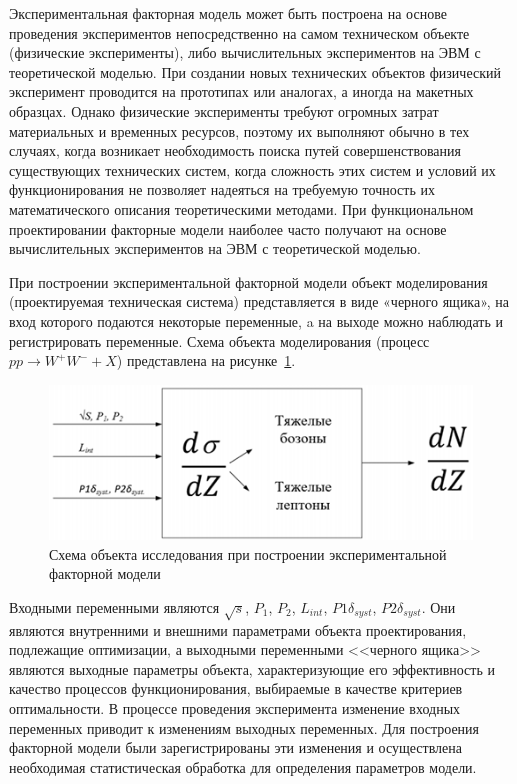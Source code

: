 Экспериментальная факторная модель может быть построена на основе
проведения экспериментов непосредственно на самом техническом объекте
(физические эксперименты), либо вычислительных экспериментов на ЭВМ с
теоретической моделью. При создании новых технических объектов физический
эксперимент проводится на прототипах или аналогах, а иногда на макетных
образцах. Однако физические эксперименты требуют огромных затрат
материальных и временных ресурсов, поэтому их выполняют обычно в тех
случаях, когда возникает необходимость поиска путей совершенствования
существующих технических систем, когда сложность этих систем и условий их
функционирования не позволяет надеяться на требуемую точность их
математического описания теоретическими методами. При функциональном
проектировании факторные модели наиболее часто получают на основе
вычислительных экспериментов на ЭВМ с теоретической моделью. 

При построении экспериментальной факторной модели объект
моделирования (проектируемая техническая система) представляется в виде
«черного ящика», на вход которого подаются некоторые переменные, a на
выходе можно наблюдать и регистрировать переменные. Схема объекта
моделирования (процесс $pp \rightarrow W^+W^- + X$) представлена на рисунке~\ref{fig:schema-model}.

\begin{figure}[!h]
	\centering
	\includegraphics[width=\textwidth]{figures/imitation-schema.png}
	\caption{Схема объекта исследования при построении экспериментальной
		факторной модели}
	\label{fig:schema-model}
\end{figure}

Входными переменными являются $\sqrt{s}$, ${P}_{1}$, ${P}_{2}$, ${L}_{int}$, $P\textit{1}{\delta}_{syst}$, $P\textit{2}{\delta}_{syst}$. Они
являются внутренними и внешними параметрами объекта проектирования,
подлежащие оптимизации, а выходными переменными <<черного ящика>>
являются выходные параметры объекта, характеризующие его эффективность и
качество процессов функционирования, выбираемые в качестве критериев
оптимальности. В процессе проведения эксперимента изменение входных
переменных приводит к изменениям выходных переменных. Для построения
факторной модели были зарегистрированы эти изменения и осуществлена
необходимая статистическая обработка для определения параметров модели.